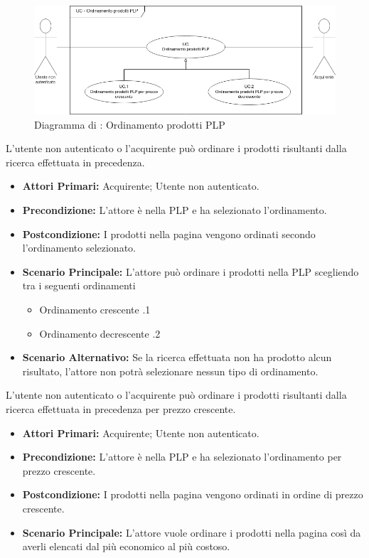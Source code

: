 

\begin{figure}[H]
	\centering
	\includegraphics[width=\textwidth]{Immagini/DiagrammiUC/OrdinamentoProdotti.png}
	\caption{Diagramma di \actualUC: Ordinamento prodotti PLP} 
	\label{fig:OrdinamentoProdotti}
\end{figure}

L'utente non autenticato o l'acquirente può ordinare i prodotti risultanti dalla ricerca effettuata in precedenza.
\begin{itemize}
	\item \textbf{Attori Primari:} Acquirente; Utente non autenticato.
	\item \textbf{Precondizione:} L'attore è nella PLP e ha selezionato l'ordinamento.
	\item \textbf{Postcondizione:} I prodotti nella pagina vengono ordinati secondo l'ordinamento selezionato.
	\item \textbf{Scenario Principale:} L'attore può ordinare i prodotti nella PLP scegliendo tra i seguenti ordinamenti
	\begin{itemize}
		\item Ordinamento crescente \actualUC.1
		\item Ordinamento decrescente \actualUC.2
	\end{itemize}
	\item \textbf{Scenario Alternativo:} Se la ricerca effettuata non ha prodotto alcun risultato, l'attore non potrà selezionare nessun tipo di ordinamento.
\end{itemize}
\resetSubUC

L'utente non autenticato o l'acquirente può ordinare i prodotti risultanti dalla ricerca effettuata in precedenza per prezzo crescente.
\begin{itemize}
    \item \textbf{Attori Primari:} Acquirente; Utente non autenticato.
    \item \textbf{Precondizione:} L'attore è nella PLP e ha selezionato l'ordinamento per prezzo crescente.
    \item \textbf{Postcondizione:} I prodotti nella pagina vengono ordinati in ordine di prezzo crescente.
    \item \textbf{Scenario Principale:} L'attore vuole ordinare i prodotti nella pagina così da averli elencati dal più economico al più costoso.
\end{itemize}

